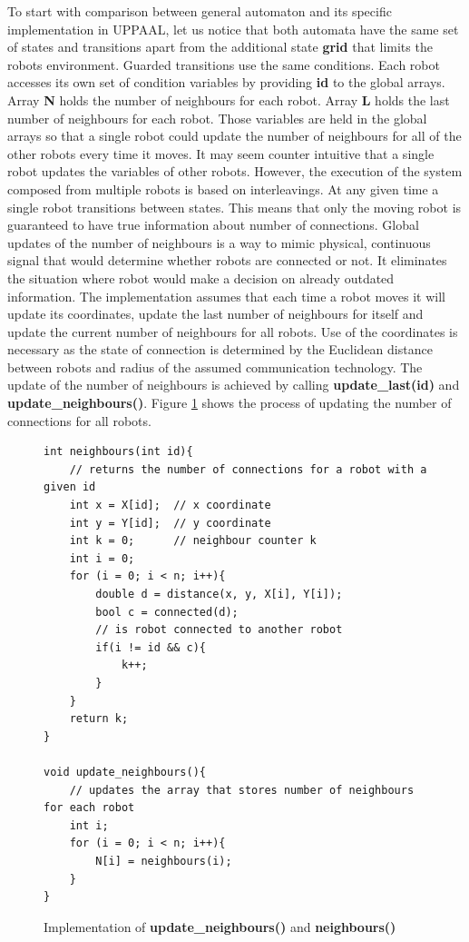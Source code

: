 To start with comparison between general automaton and its specific implementation in UPPAAL, let us notice that both automata have the same set of states and transitions apart from the additional state \textbf{grid} that limits the robots environment. Guarded transitions use the same conditions. Each robot accesses its own set of condition variables by providing \textbf{id} to the global arrays. Array \textbf{N} holds the number of neighbours for each robot. Array \textbf{L} holds the last number of neighbours for each robot. Those variables are held in the global arrays so that a single robot could update the number of neighbours for all of the other robots every time it moves. It may seem counter intuitive that a single robot updates the variables of other robots. However, the execution of the system composed from multiple robots is based on interleavings. At any given time a single robot transitions between states. This means that only the moving robot is guaranteed to have true information about number of connections. Global updates of the number of neighbours is a way to mimic physical, continuous signal that would determine whether robots are connected or not. It eliminates the situation where robot would make a decision on already outdated information. The implementation assumes that each time a robot moves it will update its coordinates, update the last number of neighbours for itself and update the current number of neighbours for all robots. Use of the coordinates is necessary as the state of connection is determined by the Euclidean distance between robots and radius of the assumed communication technology. The update of the number of neighbours is achieved by calling \textbf{update\_last(id)} and \textbf{update\_neighbours()}. Figure \ref{fig:neighbours} shows the process of updating the number of connections for all robots.

\begin{figure}[H]
\caption{Implementation of \textbf{update\_neighbours()} and \textbf{neighbours()}}
\lstset { language=C++ }
\begin{lstlisting}
int neighbours(int id){
    // returns the number of connections for a robot with a given id
    int x = X[id];  // x coordinate
    int y = Y[id];  // y coordinate
    int k = 0;      // neighbour counter k
    int i = 0;   
    for (i = 0; i < n; i++){
        double d = distance(x, y, X[i], Y[i]);
        bool c = connected(d);
        // is robot connected to another robot
        if(i != id && c){
            k++;
        }
    }
    return k;
}

void update_neighbours(){
    // updates the array that stores number of neighbours for each robot
    int i;
    for (i = 0; i < n; i++){
        N[i] = neighbours(i);
    }
}
\end{lstlisting}
\label{fig:neighbours}
\end{figure}

